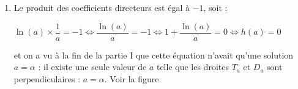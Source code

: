 
\begin{enumerate}[resume]
\item %
Le produit des coefficients directeurs est égal à $- 1$, soit :

$\ln (a) \times \dfrac{1}{a} = - 1 \iff \dfrac{\ln (a)}{a} = - 1 \iff 1 + \dfrac{\ln (a)}{a} = 0 \iff h(a) = 0$

 et on a vu à la fin de la partie I que cette équation n'avait qu'une solution $a = \alpha$ : il existe une seule valeur de $a$ telle que les droites $T_a$ et $D_a$ sont perpendiculaires : $a = \alpha$. Voir la figure.
\end{enumerate}


